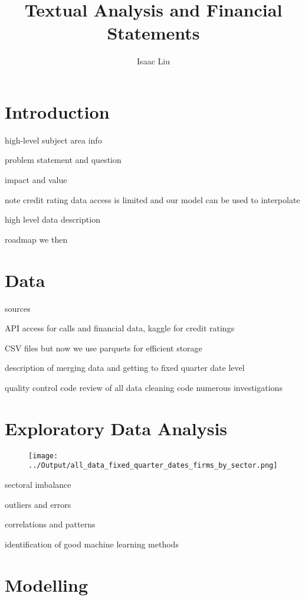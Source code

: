\documentclass{article}
\title{Textual Analysis and Financial Statements}
\author{Isaac Liu}
\begin{document}
	\maketitle

    \section*{Introduction}

    high-level subject area info

    \citep{das_credit_2023}

    problem statement and question

    impact and value

    note credit rating data access is limited and our model can be used to interpolate

    high level data description

    roadmap
    we then

    \section*{Data}

    sources

    API access for calls and financial data, kaggle for credit ratings

    CSV files but now we use parquets for efficient storage

    description of merging data and getting to fixed quarter date level

    quality control
    code review of all data cleaning code
    numerous investigations

    \section*{Exploratory Data Analysis}

	\begin{figure}[h!]
		\centering
        \texttt{[image: ../Output/all\_data\_fixed\_quarter\_dates\_firms\_by\_sector.png]}
	\end{figure}

    sectoral imbalance

    outliers and errors

    correlations and patterns

    identification of good machine learning methods

    \section*{Modelling}
\end{document}
